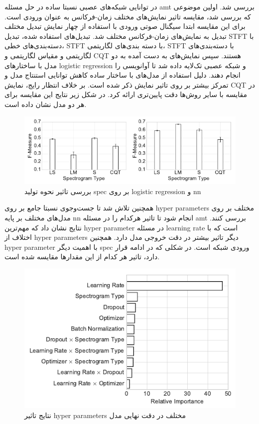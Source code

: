 در \cite{kelz2016potential} توانایی شبکه‌های عصبی نسبتا ساده در حل مسئله
\gls{amt} بررسی شد. اولین موضوعی که بررسی شد، مقایسه تاثیر نمایش‌های مختلف
زمان-فرکانس به عنوان ورودی است. برای این مقایسه ابتدا سیگنال صوتی ورودی با
استفاده از چهار نمایش تبدیل مختلف تبدیل به نمایش‌های زمان-فرکانس مختلف شد.
تبدیل‌های استفاده شده، تبدیل \gls{STFT} با دسته‌بندی‌های خطی، \gls{STFT} با دسته
بندی‌های لگاریتمی، \gls{STFT} با دسته‌بندی‌های لگاریتمی و مقیاس لگاریتمی و
\gls{CQT} هستند. سپس نمایش‌های به دست آمده به دو مدل با ساختارهای \gls{logistic
regression} و شبکه عصبی تک‌لایه داده شد تا آوانویسی را انجام دهند. دلیل استفاده
از مدل‌های با ساختار ساده کاهش توانایی استنتاج مدل و تمرکز بیشتر بر روی تاثیر
نمایش ذکر شده است. بر خلاف انتظار رایج، نمایش \gls{CQT} در مقایسه با سایر روش‌ها
دقت پایین‌تری ارائه کرد. در شکل زیر نتایج این مقایسه برای هر دو مدل نشان داده
است.
\begin{figure}[ht]
    \centering
    \includegraphics[width=12cm]{./statics/kelz2016potential_spec.png}
    \caption{بررسی تاثیر نحوه تولید \gls{spec} بر روی \gls{logistic regression} و \gls{nn}}
\end{figure}

همچنین تلاش شد تا جست‌وجوی نسبتا جامع بر روی \glspl{hyper parameter} مختلف بر
روی مدل‌های مختلف بر پایه \gls{nn} انجام شود تا تاثیر هرکدام را در مسئله
\gls{amt} بررسی کنند. نتایج نشان داد که مهم‌ترین \gls{hyper parameter} در مسئله
\gls{learning rate} است که با اختلاف از \glspl{hyper parameter} دیگر تاثیر بیشتر
در دقت خروجی مدل دارد. همچنین \gls{hyper parameter} با اهمیت دیگر \gls{spec}
ورودی شبکه است. در شکلی که در ادامه قرار دارد، تاثیر هر کدام از این مقدارها
مقایسه شده است.
\begin{figure}[ht]
    \centering
    \includegraphics[width=12cm]{./statics/kelz2016potential_hp.png}
    \caption{نتایج تاثیر \glspl{hyper parameter} مختلف در دقت نهایی مدل}
\end{figure}

